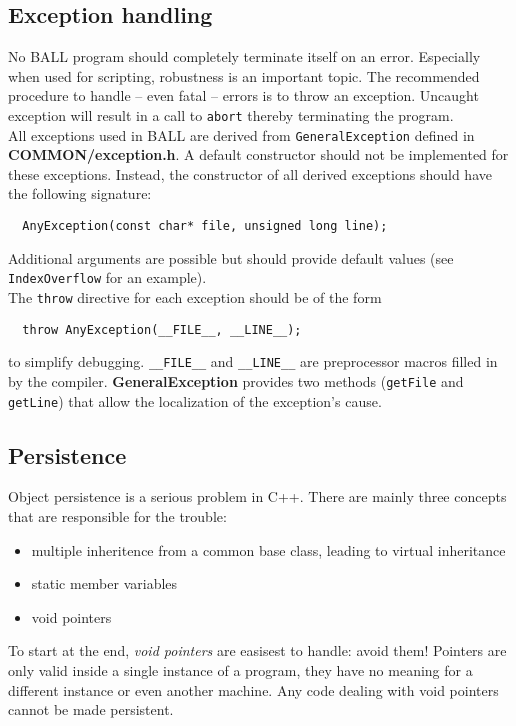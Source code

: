 \documentclass[a4]{article}
\begin{document}
\subsection{Exception handling}

No BALL program should completely terminate itself on an error. Especially
when used for scripting, robustness is an important topic. The recommended
procedure to handle -- even fatal -- errors is to throw an exception. Uncaught
exception will result in a call to {\tt abort} thereby terminating the
program.\\
All exceptions used in BALL are derived from {\tt GeneralException}
defined in {\bf COMMON/exception.h}. A default constructor should not be
implemented for these exceptions. Instead, the constructor of all derived
exceptions should have the following signature:
\begin{verbatim}
  AnyException(const char* file, unsigned long line);
\end{verbatim}
Additional arguments are possible but should provide default values (see
{\tt IndexOverflow} for an example).\\
The {\tt throw} directive for each exception should be of the form
\begin{verbatim}
  throw AnyException(__FILE__, __LINE__);
\end{verbatim}
to simplify debugging. {\tt \_\_FILE\_\_} and {\tt \_\_LINE\_\_} are preprocessor
macros filled in by the compiler. {\bf GeneralException} provides two methods
({\tt getFile} and {\tt getLine}) that allow the localization of the
exception's cause.\\


\subsection{Persistence}

Object persistence is a serious problem in C++. There are mainly three
concepts that are responsible for the trouble:
\begin{itemize}
	\item multiple inheritence from a common base class, leading to virtual
		inheritance
	\item static member variables
	\item void pointers
\end{itemize}

To start at the end, {\em void pointers} are easisest to handle: avoid them!
Pointers are only valid inside a single instance of a program, they have no
meaning for a different instance or even another machine. Any code dealing
with void pointers cannot be made persistent.
\end{document}
